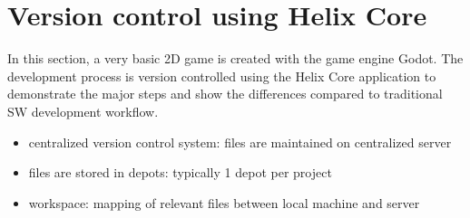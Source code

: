 \section{Version control using Helix Core\textsuperscript{\texttrademark}}
In this section, a very basic 2D game is created with the game engine Godot. The development process is version 
controlled using the Helix Core application to demonstrate the major steps and show the differences compared to 
traditional SW development workflow.
\begin{itemize}
    \item centralized version control system: files are maintained on centralized server
    \item files are stored in depots: typically 1 depot per project
    \item workspace: mapping of relevant files between local machine and server
\end{itemize}


